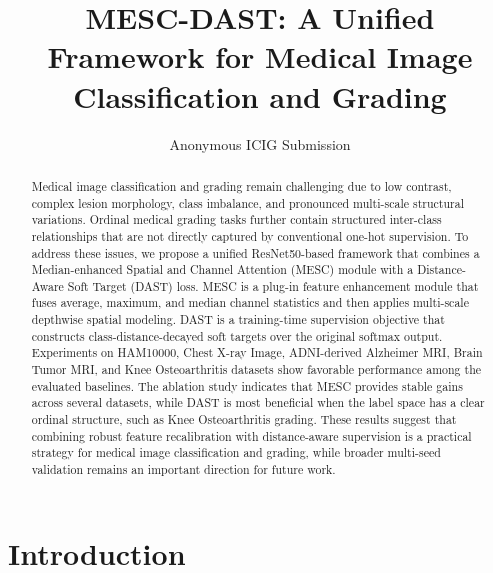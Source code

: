 \documentclass[runningheads]{llncs}
\begin{document}
\title{MESC-DAST: A Unified Framework for Medical Image Classification and Grading}

\author{Anonymous ICIG Submission}

\maketitle

\begin{abstract}
Medical image classification and grading remain challenging due to low contrast, complex lesion morphology, class imbalance, and pronounced multi-scale structural variations. Ordinal medical grading tasks further contain structured inter-class relationships that are not directly captured by conventional one-hot supervision. To address these issues, we propose a unified ResNet50-based framework that combines a Median-enhanced Spatial and Channel Attention (MESC) module with a Distance-Aware Soft Target (DAST) loss. MESC is a plug-in feature enhancement module that fuses average, maximum, and median channel statistics and then applies multi-scale depthwise spatial modeling. DAST is a training-time supervision objective that constructs class-distance-decayed soft targets over the original softmax output. Experiments on HAM10000, Chest X-ray Image, ADNI-derived Alzheimer MRI, Brain Tumor MRI, and Knee Osteoarthritis datasets show favorable performance among the evaluated baselines. The ablation study indicates that MESC provides stable gains across several datasets, while DAST is most beneficial when the label space has a clear ordinal structure, such as Knee Osteoarthritis grading. These results suggest that combining robust feature recalibration with distance-aware supervision is a practical strategy for medical image classification and grading, while broader multi-seed validation remains an important direction for future work.

\end{abstract}

\section{Introduction}
\end{document}
